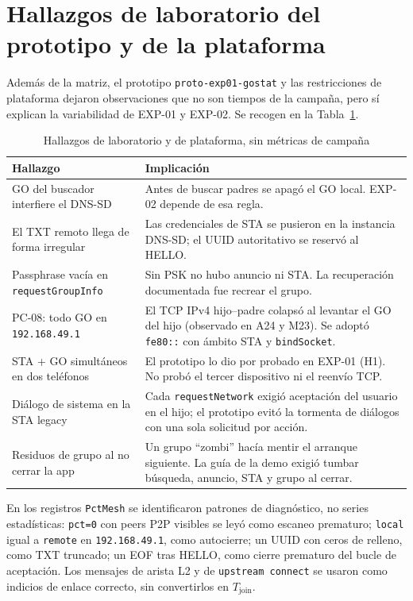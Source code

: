 \documentclass[12pt,oneside]{scrreprt}
\begin{document}
\section{Hallazgos de laboratorio del prototipo y de la plataforma}

Además de la matriz, el prototipo \texttt{proto-exp01-gostat} y las restricciones de plataforma dejaron observaciones que no son tiempos de la campaña, pero sí explican la variabilidad de EXP-01 y EXP-02. Se recogen en la Tabla~\ref{tab:hallazgos-lab}.

\begin{table}[H]
\centering
\singlespacing
\caption{Hallazgos de laboratorio y de plataforma, sin métricas de campaña}
\label{tab:hallazgos-lab}
\renewcommand{\arraystretch}{1.15}
\begin{tabularx}{\textwidth}{@{} >{\raggedright\arraybackslash}p{4.4cm} X @{}}
\toprule
\textbf{Hallazgo} & \textbf{Implicación} \\
\midrule
GO del buscador interfiere el DNS-SD & Antes de buscar padres se apagó el GO local. EXP-02 depende de esa regla. \\
El TXT remoto llega de forma irregular & Las credenciales de STA se pusieron en la instancia DNS-SD; el UUID autoritativo se reservó al HELLO. \\
Passphrase vacía en \texttt{requestGroupInfo} & Sin PSK no hubo anuncio ni STA. La recuperación documentada fue recrear el grupo. \\
PC-08: todo GO en \texttt{192.168.49.1} & El TCP IPv4 hijo--padre colapsó al levantar el GO del hijo (observado en A24 y M23). Se adoptó \texttt{fe80::} con ámbito STA y \texttt{bindSocket}. \\
STA + GO simultáneos en dos teléfonos & El prototipo lo dio por probado en EXP-01 (H1). No probó el tercer dispositivo ni el reenvío TCP. \\
Diálogo de sistema en la STA legacy & Cada \texttt{requestNetwork} exigió aceptación del usuario en el hijo; el prototipo evitó la tormenta de diálogos con una sola solicitud por acción. \\
Residuos de grupo al no cerrar la app & Un grupo \enquote{zombi} hacía mentir el arranque siguiente. La guía de la demo exigió tumbar búsqueda, anuncio, STA y grupo al cerrar. \\
\bottomrule
\end{tabularx}
\end{table}

En los registros \texttt{PctMesh} se identificaron patrones de diagnóstico, no series estadísticas: \texttt{pct=0} con peers P2P visibles se leyó como escaneo prematuro; \texttt{local} igual a \texttt{remote} en \texttt{192.168.49.1}, como autocierre; un UUID con ceros de relleno, como TXT truncado; un EOF tras HELLO, como cierre prematuro del bucle de aceptación. Los mensajes de arista L2 y de \texttt{upstream connect} se usaron como indicios de enlace correcto, sin convertirlos en $T_{\mathrm{join}}$.
\end{document}
